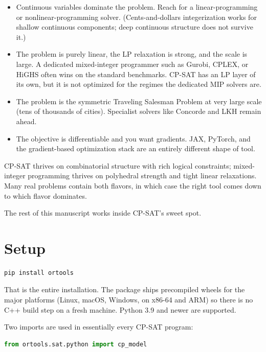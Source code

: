 \begin{itemize}
\item
  Continuous variables dominate the problem. Reach for a
  linear-programming or nonlinear-programming solver. (Cents-and-dollars
  integerization works for shallow continuous components; deep
  continuous structure does not survive it.)
\item
  The problem is purely linear, the LP relaxation is strong, and the
  scale is large. A dedicated mixed-integer programmer such as Gurobi,
  CPLEX, or HiGHS often wins on the standard benchmarks. CP-SAT has an
  LP layer of its own, but it is not optimized for the regimes the
  dedicated MIP solvers are.
\item
  The problem is the symmetric Traveling Salesman Problem at very large
  scale (tens of thousands of cities). Specialist solvers like Concorde
  and LKH remain ahead.
\item
  The objective is differentiable and you want gradients. JAX, PyTorch,
  and the gradient-based optimization stack are an entirely different
  shape of tool.
\end{itemize}

CP-SAT thrives on combinatorial structure with rich logical constraints;
mixed-integer programming thrives on polyhedral strength and tight
linear relaxations. Many real problems contain both flavors, in which
case the right tool comes down to which flavor dominates.

The rest of this manuscript works inside CP-SAT's sweet spot.

\section{Setup}\label{sec:5.3}

\begin{lstlisting}[language=bash]
pip install ortools
\end{lstlisting}

That is the entire installation. The package ships precompiled wheels
for the major platforms (Linux, macOS, Windows, on x86-64 and ARM)
so there is no C++ build step on a fresh machine. Python 3.9 and newer
are supported.

Two imports are used in essentially every CP-SAT program:

\begin{lstlisting}[language=Python]
from ortools.sat.python import cp_model
\end{lstlisting}


